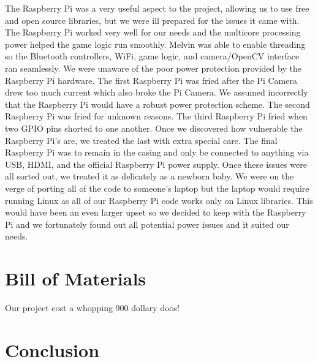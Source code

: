 \documentclass[11pt]{ieeeconf}
\begin{document}
The Raspberry Pi was a very useful aspect to the project, allowing us to use free and open source libraries, but we were ill prepared for the issues it came with. The Raspberry Pi worked very well for our needs and the multicore processing power helped the game logic run smoothly. Melvin was able to enable threading so the Bluetooth controllers, WiFi, game logic, and camera/OpenCV interface ran seamlessly. We were unaware of the poor power protection provided by the Raspberry Pi hardware. The first Raspberry Pi was fried after the Pi Camera drew too much current which also broke the Pi Camera. We assumed incorrectly that the Raspberry Pi would have a robust power protection scheme. The second Raspberry Pi was fried for unknown reasons. The third Raspberry Pi fried when two GPIO pins shorted to one another. Once we discovered how vulnerable the Raspberry Pi's are, we treated the last with extra special care. The final Raspberry Pi was to remain in the casing and only be connected to anything via USB, HDMI, and the official Raspberry Pi power supply. Once these issues were all sorted out, we treated it as delicately as a newborn baby. We were on the verge of porting all of the code to someone's laptop but the laptop would require running Linux as all of our Raspberry Pi code works only on Linux libraries. This would have been an even larger upset so we decided to keep with the Raspberry Pi and we fortunately found out all potential power issues and it suited our needs. 

\section{Bill of Materials}

Our project cost a whopping 900 dollary doos!

\section{Conclusion}



\end{document}
